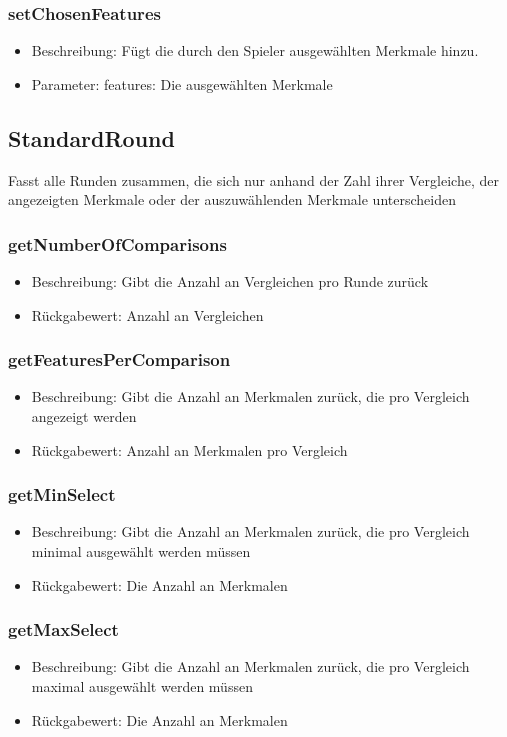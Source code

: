 \documentclass[a4paper]{scrreprt}
\begin{document}
	\subsubsection{setChosenFeatures}
	\begin{itemize}
		\item Beschreibung: Fügt die durch den Spieler ausgewählten Merkmale hinzu.
		\item Parameter: features: Die ausgewählten Merkmale
	\end{itemize}
	
	\subsection{StandardRound}
	Fasst alle Runden zusammen, die sich nur anhand der Zahl ihrer Vergleiche, der angezeigten Merkmale oder der auszuwählenden Merkmale unterscheiden
	\subsubsection{getNumberOfComparisons}
	\begin{itemize}
		\item Beschreibung: Gibt die Anzahl an Vergleichen pro Runde zurück
		\item Rückgabewert: Anzahl an Vergleichen
	\end{itemize}
	\subsubsection{getFeaturesPerComparison}
	\begin{itemize}
		\item Beschreibung: Gibt die Anzahl an Merkmalen zurück, die pro Vergleich angezeigt werden
		\item Rückgabewert: Anzahl an Merkmalen pro Vergleich
	\end{itemize}
	\subsubsection{getMinSelect}
	\begin{itemize}
		\item Beschreibung: Gibt die Anzahl an Merkmalen zurück, die pro Vergleich minimal ausgewählt werden müssen
		\item Rückgabewert: Die Anzahl an Merkmalen
	\end{itemize}
	\subsubsection{getMaxSelect}
	\begin{itemize}
		\item Beschreibung: Gibt die Anzahl an Merkmalen zurück, die pro Vergleich maximal ausgewählt werden müssen
		\item Rückgabewert: Die Anzahl an Merkmalen
	\end{itemize}
	
\end{document}
